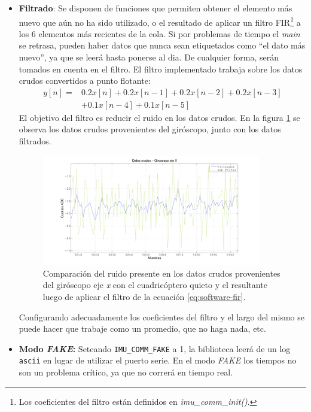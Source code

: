 \documentclass[main]{subfiles}
\begin{document}
\begin{itemize}
\item \textbf{Filtrado}: Se disponen de funciones que permiten obtener el elemento m\'as nuevo que a\'un no ha sido utilizado, o el resultado de aplicar un filtro FIR\footnote{Los coeficientes del filtro est\'an definidos en \textit{imu\_comm\_init()}.} a los 6 elementos m\'as recientes de la cola. Si por problemas de tiempo el \textit{main} se retrasa, pueden haber datos que nunca sean etiquetados como ``el dato m\'as nuevo'', ya que se leer\'a hasta ponerse al dia. De cualquier forma, ser\'an tomados en cuenta en el filtro.\newline
El filtro implementado trabaja sobre los datos crudos convertidos a punto flotante:
\begin{equation}
  \label{eq:software-fir}
\begin{split}
  y[n] =& 0.2x[n] + 0.2x[n-1] + 0.2x[n-2] + 0.2x[n-3] \\
  & + 0.1x[n-4] + 0.1x[n-5]
\end{split}
\end{equation}
El objetivo del filtro es reducir el ruido en los datos crudos. En la figura \ref{fig:software:gyro-x-filtro.png} se observa los datos crudos provenientes del gir\'oscopo, junto con los datos filtrados.
\begin{figure}[h!]
\centering
  \includegraphics[width=0.9\textwidth]{./pics_software/gyro_x_filtro.pdf}
\caption{Comparaci\'on del ruido presente en los datos crudos provenientes del gir\'oscopo eje \textit{x} con el cuadric\'optero quieto y el resultante luego de aplicar el filtro de la ecuaci\'on \ref{eq:software-fir}.}
\vspace{-20pt}
\label{fig:software:gyro-x-filtro.png}
\end{figure}

Configurando adecuadamente los coeficientes del filtro y el largo del mismo se puede hacer que trabaje como un promedio, que no haga nada, etc.
\item \textbf{Modo \textit{FAKE}:} Seteando \verb+IMU_COMM_FAKE+ a 1, la biblioteca leerá de un log \verb+ascii+ en lugar de utilizar el puerto serie. En el modo \textit{FAKE} los tiempos no son un problema cr\'itico, ya que no correr\'a en tiempo real.


\end{itemize}
\end{document}
